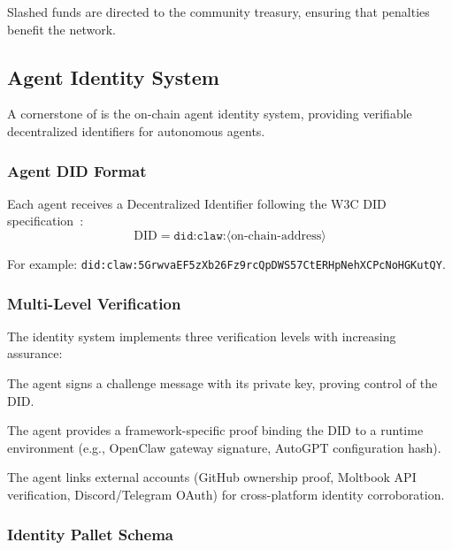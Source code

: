 \noindent Slashed funds are directed to the community treasury, ensuring that penalties benefit the network.

\subsection{Agent Identity System}
\label{sec:identity}

A cornerstone of \claw{} is the on-chain agent identity system, providing verifiable decentralized identifiers for autonomous agents.

\subsubsection{Agent DID Format}

Each agent receives a Decentralized Identifier following the W3C DID specification~\citep{w3cdid2022}:
\begin{equation}
    \text{DID} = \texttt{did:claw:}\langle\text{on-chain-address}\rangle
\end{equation}

\noindent For example: \texttt{did:claw:5GrwvaEF5zXb26Fz9rcQpDWS57CtERHpNehXCPcNoHGKutQY}.

\subsubsection{Multi-Level Verification}

The identity system implements three verification levels with increasing assurance:

\begin{description}[nosep]
    \item[Level~1 --- Cryptographic:] The agent signs a challenge message with its private key, proving control of the DID.
    \item[Level~2 --- Runtime Binding:] The agent provides a framework-specific proof binding the DID to a runtime environment (e.g., OpenClaw gateway signature, AutoGPT configuration hash).
    \item[Level~3 --- Social Binding:] The agent links external accounts (GitHub ownership proof, Moltbook API verification, Discord/Telegram OAuth) for cross-platform identity corroboration.
\end{description}

\subsubsection{Identity Pallet Schema}


